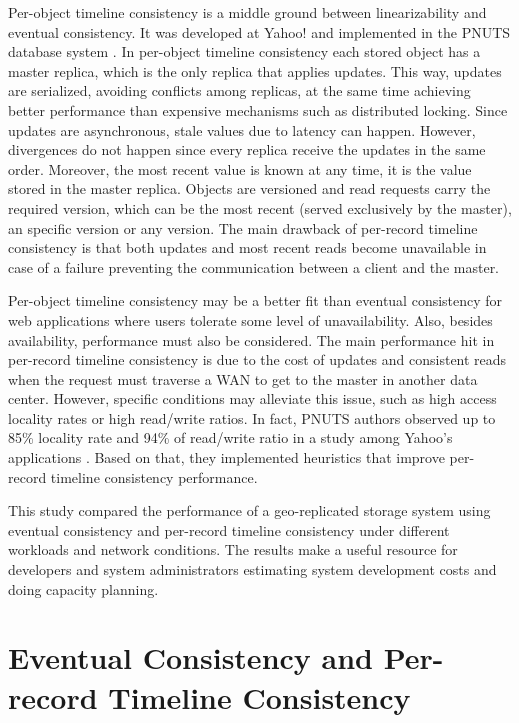 \documentclass[doublespacing]{bmcart}
\begin{document}
Per-object timeline consistency is a middle ground between linearizability and eventual consistency. It was developed at Yahoo! and implemented in the PNUTS database system \cite{Cooper2008}. In per-object timeline consistency each stored object has a master replica, which is the only replica that applies updates. This way, updates are serialized, avoiding conflicts among replicas, at the same time achieving better performance than expensive mechanisms such as distributed locking. Since updates are
asynchronous, stale values due to latency can happen. However, divergences do
not happen since every replica receive the updates in the same order. Moreover,
the most recent value is known at any time, it is the value stored in the
master replica. Objects are versioned and read requests carry the required
version, which can be the most recent (served exclusively by the master), an specific version or any version. The main drawback of per-record timeline consistency is that both
updates and most recent reads become unavailable in case of a
failure preventing the communication between a client and the master.

Per-object timeline consistency may be a better fit than eventual consistency for web
applications where users tolerate some level of unavailability. Also,
besides availability, performance must also be considered. The main performance
hit in per-record timeline consistency is due to the cost of updates and consistent reads
when the request must traverse a WAN to get to the master in another data
center. However, specific conditions may alleviate this issue, such as high
access locality rates or high read/write ratios. In fact, PNUTS authors observed
up to 85\% locality rate and 94\% of read/write ratio in a study among Yahoo's
applications \cite{Cooper2008, Kadambi2011}. Based on that, they implemented
heuristics that improve per-record timeline consistency performance.

This study compared the performance of a geo-replicated storage system using
eventual consistency and per-record timeline consistency under different workloads and
network conditions. The results make a useful resource for developers and system
administrators estimating system development costs and doing capacity planning.

\section{Eventual Consistency and Per-record Timeline Consistency}
\end{document}
